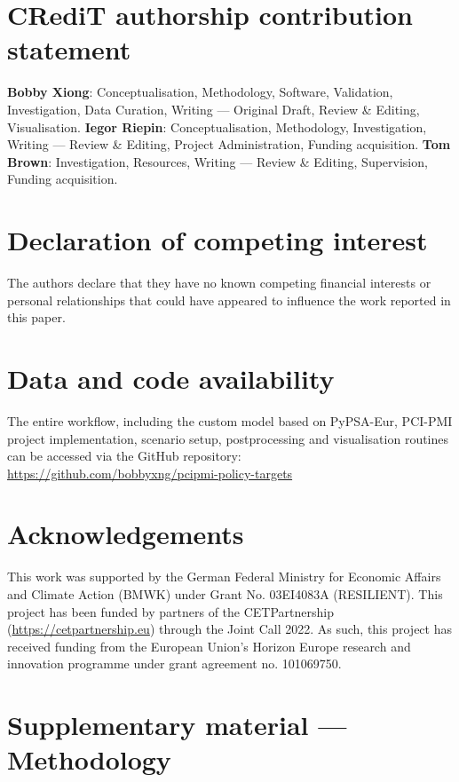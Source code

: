 \documentclass[preprint,12pt,sort&compress]{elsarticle}
\begin{document}
\newpage
\section*{CRediT authorship contribution statement}
\textbf{Bobby Xiong}: Conceptualisation, Methodology, Software, Validation, Investigation, Data Curation, Writing --- Original Draft, Review \& Editing, Visualisation. \textbf{Iegor Riepin}: Conceptualisation, Methodology, Investigation, Writing --- Review \& Editing, Project Administration, Funding acquisition. \textbf{Tom Brown}: Investigation, Resources, Writing --- Review \& Editing, Supervision, Funding acquisition.

\section*{Declaration of competing interest}
The authors declare that they have no known competing financial interests or personal relationships that could have appeared to influence the work reported in this paper.

\section*{Data and code availability}
The entire workflow, including the custom model based on PyPSA-Eur, PCI-PMI project implementation, scenario setup, postprocessing and visualisation routines can be accessed via the GitHub repository: \newline 
\href{https://github.com/bobbyxng/pcipmi-policy-targets}{https://github.com/bobbyxng/pcipmi-policy-targets}

\section*{Acknowledgements}
This work was supported by the German Federal Ministry for Economic Affairs and Climate Action (BMWK) under Grant No. 03EI4083A (RESILIENT). This project has been funded by partners of the CETPartnership (\href{https://cetpartnership.eu}{https://cetpartnership.eu}) through the Joint Call 2022. As such, this project has received funding from the European Union's Horizon Europe research and innovation programme under grant agreement no. 101069750.


\newpage
\appendix
\section{Supplementary material --- Methodology}
\label{app:methodology}
\end{document}

